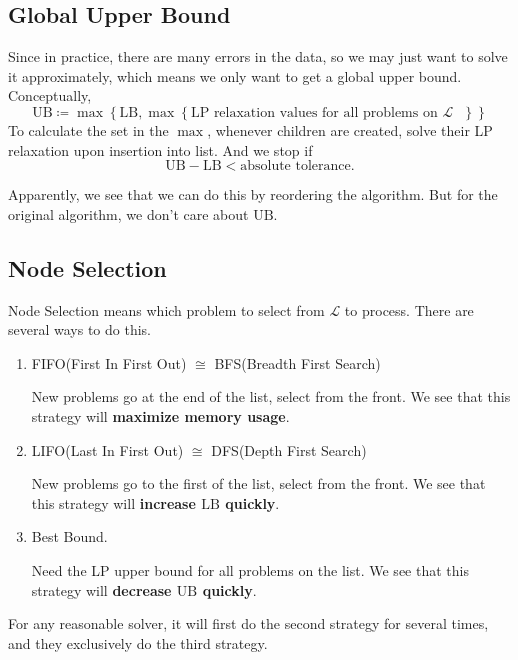 \subsection{Global Upper Bound}
Since in practice, there are many errors in the data, so we may just want to solve it approximately, which means we only want to get a global upper bound.
Conceptually,
\[
	\mathrm{UB} \coloneqq \max\left\{\mathrm{LB}, \max\left\{\text{\(\mathrm{LP}\) relaxation values for all problems on \(\mathcal{L}\) }\right\}\right\}
\]
To calculate the set in the \(\max\), whenever children are created, solve their LP relaxation upon insertion into list. And we stop if
\[
	\mathrm{UB} - \mathrm{LB} < \text{absolute tolerance}.
\]

\begin{remark}
	Apparently, we see that we can do this by reordering the algorithm. But for the original algorithm, we don't care about \(\mathrm{UB}\).
\end{remark}

\subsection{Node Selection}
Node Selection means which problem to select from \(\mathcal{L} \) to process. There are several ways to do this.
\begin{enumerate}
	\item FIFO(First In First Out) \(\cong\) BFS(Breadth First Search)
	      \par New problems go at the end of the list, select from the front. We see that this strategy will \textbf{maximize memory usage}.
	\item LIFO(Last In First Out) \(\cong\) DFS(Depth First Search)
	      \par New problems go to the first of the list, select from the front. We see that this strategy will \textbf{increase \(\mathrm{LB}\) quickly}.
	\item Best Bound.
	      \par Need the LP upper bound for all problems on the list. We see that this strategy will \textbf{decrease \(\mathrm{UB}\) quickly}.
\end{enumerate}

\begin{remark}
	For any reasonable solver, it will first do the second strategy for several times, and they exclusively do the third strategy.
\end{remark}

